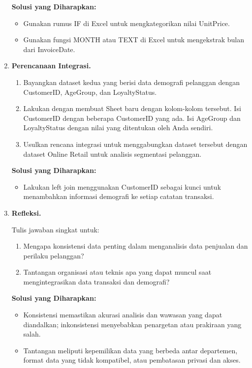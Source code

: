 \begin{enumerate}
	\textbf{Solusi yang Diharapkan:}
	
	\begin{itemize}
		\item Gunakan rumus IF di Excel untuk mengkategorikan nilai UnitPrice.
		\item Gunakan fungsi MONTH atau TEXT di Excel untuk mengekstrak bulan dari InvoiceDate.
	\end{itemize}
	
	\item \textbf{Perencanaan Integrasi.}
	
	\begin{enumerate}
		\item Bayangkan dataset kedua yang berisi data demografi pelanggan dengan CustomerID, AgeGroup, dan LoyaltyStatus. 
		\item Lakukan dengan membuat Sheet baru dengan kolom-kolom tersebut. Isi CustomerID dengan beberapa CustomerID yang ada. Isi AgeGroup dan LoyaltyStatus dengan nilai yang ditentukan oleh Anda sendiri.
		\item Usulkan rencana integrasi untuk menggabungkan dataset tersebut dengan dataset Online Retail untuk analisis segmentasi pelanggan.
	\end{enumerate}
	
	\textbf{Solusi yang Diharapkan:}
	
	\begin{itemize}
		\item Lakukan left join menggunakan CustomerID sebagai kunci untuk menambahkan informasi demografi ke setiap catatan transaksi.
	\end{itemize}
	
	\item \textbf{Refleksi.}
	
	Tulis jawaban singkat untuk:
	
	\begin{enumerate}
		\item Mengapa konsistensi data penting dalam menganalisis data penjualan dan perilaku pelanggan?
		\item Tantangan organisasi atau teknis apa yang dapat muncul saat mengintegrasikan data transaksi dan demografi?
	\end{enumerate}
	
	\textbf{Solusi yang Diharapkan:}
	
	\begin{itemize}
		\item Konsistensi memastikan akurasi analisis dan wawasan yang dapat diandalkan; inkonsistensi menyebabkan penargetan atau prakiraan yang salah.
		\item Tantangan meliputi kepemilikan data yang berbeda antar departemen, format data yang tidak kompatibel, atau pembatasan privasi dan akses.
	\end{itemize}
	
	
\end{enumerate}

